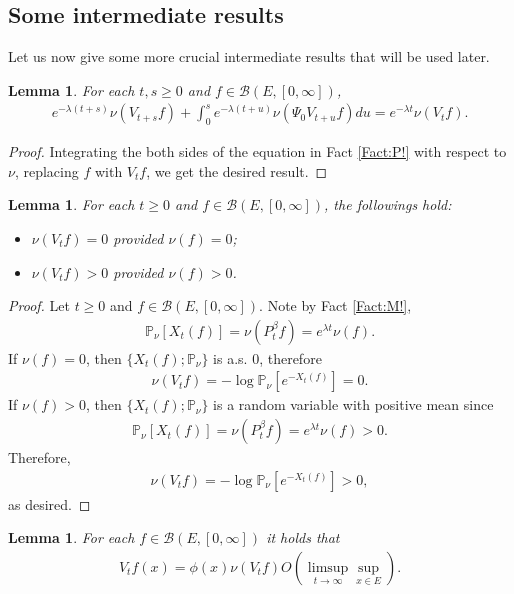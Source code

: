 \documentclass[12pt,a4paper]{amsart}
\numberwithin{equation}{section}
\theoremstyle{plain}
\newtheorem{lem}[thm]{Lemma}
\theoremstyle{definition}
\theoremstyle{remark}
\begin{document}
\subsection{Some intermediate results}
Let us now give some more crucial intermediate results that will be used later.
\begin{lem} \label{Lemma:nuP!} 
For each $t, s\geq 0$ and $f\in \mathcal B(E,[0,\infty])$,
\begin{align}
  e^{- \lambda (t+s)} \nu(V_{t+s}f) + \int_0^s e^{- \lambda (t+u)} \nu(\Psi_0 V_{t+u}f) du 
  = e^{- \lambda t} \nu(V_t f).
  \end{align}
\end{lem}
\begin{proof}
Integrating the both sides of the equation in Fact \ref{Fact:P!} with respect to $\nu$, replacing $f$ with $V_t f$, we get the desired result.
\end{proof}
\begin{lem} \label{Lemma:nVn!} 
For each $t\geq 0$ and $f\in \mathcal B(E,[0,\infty])$, the followings hold:
\begin{itemize}
\item
$\nu(V_tf)=0 $ provided $\nu(f) = 0$; 
\item
$\nu(V_tf)>0$ provided $\nu(f)>0$.
\end{itemize}
\end{lem}
\begin{proof}
Let $t\geq 0$ and $f\in \mathcal B(E,[0,\infty])$. 
Note by Fact \ref{Fact:M!}, 
\begin{align}
 \mathbb P_\nu[X_t(f)] 
 = \nu (P_t^\beta f)
 = e^{\lambda t}\nu (f).
 \end{align}
If $\nu(f) = 0$, then $\{X_t(f); \mathbb P_\nu\}$ is a.s. $0$, therefore 
\begin{align}
 \nu(V_t f) 
 = - \log \mathbb P_\nu[e^{-X_t(f)}]
 =0.
 \end{align}
If $\nu(f) > 0$, then $\{X_t(f); \mathbb P_\nu\}$ is a random variable with positive mean since
\begin{align}
\mathbb P_\nu[X_t(f)] = \nu(P_t^\beta f) = e^{\lambda t} \nu(f)>0.
\end{align}
Therefore, 
\begin{align}
 \nu(V_tf)
 = - \log \mathbb P_\nu[e^{-X_t(f)}]
 >0,
 \end{align}
as desired.
\end{proof}
\begin{lem} \label{Lemma:VfO:H4:H3} 
For each $f\in \mathcal B(E,[0,\infty])$ it holds that 
\begin{align}
V_tf(x) 
= \phi(x) \nu(V_tf) O(\limsup_{t\to \infty} \sup_{x\in E}).
\end{align}
\end{lem}
\end{document}
